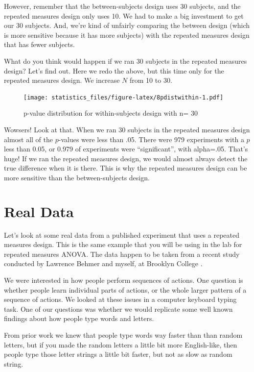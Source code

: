\documentclass[]{book}
\begin{document}
However, remember that the between-subjects design uses 30 subjects, and the repeated measures design only uses 10. We had to make a big investment to get our 30 subjects. And, we're kind of unfairly comparing the between design (which is more sensitive because it has more subjects) with the repeated measures design that has fewer subjects.

What do you think would happen if we ran 30 subjects in the repeated measures design? Let's find out. Here we redo the above, but this time only for the repeated measures design. We increase \(N\) from 10 to 30.

\begin{figure}
\centering
\texttt{[image: statistics\_files/figure-latex/8pdistwithin-1.pdf]}
\caption{\label{fig:8pdistwithin}p-value distribution for within-subjects design with n= 30}
\end{figure}

Wowsers! Look at that. When we ran 30 subjects in the repeated measures design almost all of the \(p\)-values were less than .05. There were 979 experiments with a \(p\) less than 0.05, or 0.979 of experiments were ``significant'', with alpha=.05. That's huge! If we ran the repeated measures design, we would almost always detect the true difference when it is there. This is why the repeated measures design can be more sensitive than the between-subjects design.

\hypertarget{real-data}{%
\section{Real Data}\label{real-data}}

Let's look at some real data from a published experiment that uses a repeated measures design. This is the same example that you will be using in the lab for repeated measures ANOVA. The data happen to be taken from a recent study conducted by Lawrence Behmer and myself, at Brooklyn College \citep{behmer2017spatial}.

We were interested in how people perform sequences of actions. One question is whether people learn individual parts of actions, or the whole larger pattern of a sequence of actions. We looked at these issues in a computer keyboard typing task. One of our questions was whether we would replicate some well known findings about how people type words and letters.

From prior work we knew that people type words way faster than than random letters, but if you made the random letters a little bit more English-like, then people type those letter strings a little bit faster, but not as slow as random string.
\end{document}
